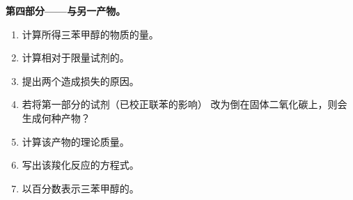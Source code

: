 \begin{problem}
\medskip
\noindent\textbf{第四部分——与另一产物。}
\begin{enumerate}[resume]
  \item 计算所得三苯甲醇的物质的量。
  \item 计算相对于限量试剂的。
  \item 提出两个造成损失的原因。
  \item 若将第一部分的试剂（已校正联苯的影响）
        改为倒在固体二氧化碳上，则会生成何种产物？
  \item 计算该产物的理论质量。
  \item 写出该羧化反应的方程式。
  \item 以百分数表示三苯甲醇的。
\end{enumerate}
\end{problem}
